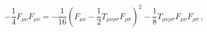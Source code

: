 \begin{equation}
 -\frac{1}{4}F_{\mu\nu}F_{\mu\nu} 
 = -\frac{1}{16}\left( F_{\mu\nu}-\frac{1}{2}T_{\mu\nu\rho\sigma}
F_{\rho\sigma}\right)^2
-\frac{1}{8} T_{\mu\nu\rho\sigma}F_{\mu\nu}F_{\rho\sigma}\nonumber\,,
\label{eq:2.3}
\end{equation}


